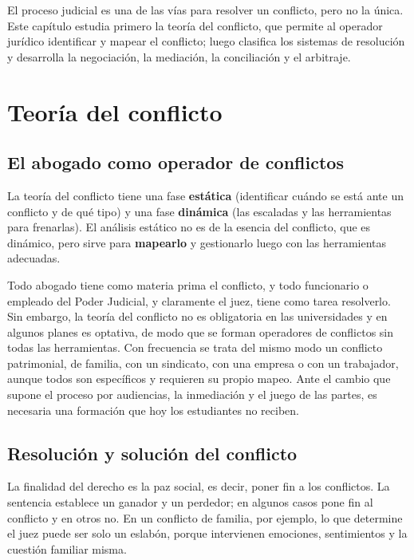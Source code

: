 \documentclass[12pt,oneside]{book}
\begin{document}
El proceso judicial es una de las vías para resolver un conflicto, pero no la única. Este capítulo estudia primero la teoría del conflicto, que permite al operador jurídico identificar y mapear el conflicto; luego clasifica los sistemas de resolución y desarrolla la negociación, la mediación, la conciliación y el arbitraje.

\section{Teoría del conflicto}

\subsection{El abogado como operador de conflictos}

La teoría del conflicto tiene una fase \textbf{estática} (identificar cuándo se está ante un conflicto y de qué tipo) y una fase \textbf{dinámica} (las escaladas y las herramientas para frenarlas). El análisis estático no es de la esencia del conflicto, que es dinámico, pero sirve para \textbf{mapearlo} y gestionarlo luego con las herramientas adecuadas.

Todo abogado tiene como materia prima el conflicto, y todo funcionario o empleado del Poder Judicial, y claramente el juez, tiene como tarea resolverlo. Sin embargo, la teoría del conflicto no es obligatoria en las universidades y en algunos planes es optativa, de modo que se forman operadores de conflictos sin todas las herramientas. Con frecuencia se trata del mismo modo un conflicto patrimonial, de familia, con un sindicato, con una empresa o con un trabajador, aunque todos son específicos y requieren su propio mapeo. Ante el cambio que supone el proceso por audiencias, la inmediación y el juego de las partes, es necesaria una formación que hoy los estudiantes no reciben.

\subsection{Resolución y solución del conflicto}

La finalidad del derecho es la paz social, es decir, poner fin a los conflictos. La sentencia establece un ganador y un perdedor; en algunos casos pone fin al conflicto y en otros no. En un conflicto de familia, por ejemplo, lo que determine el juez puede ser solo un eslabón, porque intervienen emociones, sentimientos y la cuestión familiar misma.
\end{document}
